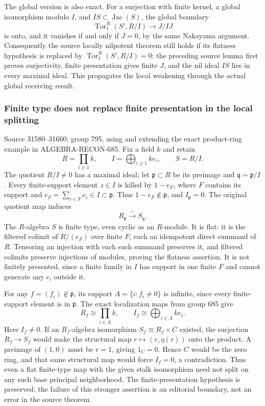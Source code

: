 The global version is also exact. For a surjection with finite kernel, a global isomorphism modulo \(I\), and \(IS\subset\operatorname{Jac}(S)\), the global boundary \[
\operatorname{Tor}_1^R(S',R/I)\longrightarrow J/IJ
\] is onto, and it vanishes if and only if \(J=0\), by the same Nakayama argument. Consequently the source locally nilpotent theorem still holds if its flatness hypothesis is replaced by \(\operatorname{Tor}_1^R(S',R/I)=0\): the preceding source lemma first proves surjectivity, finite presentation gives finite \(J\), and the nil ideal \(IS\) lies in every maximal ideal. This propagates the local weakening through the actual global receiving result.

\subsubsection{Finite type does not replace finite presentation in the local splitting}\label{algebra-proof-035-finite-type-does-not-replace-finite-presentation-in-the-local-splitting}

Source 31580--31660; group 795, using and extending the exact product-ring example in ALGEBRA-RECON-685. Fix a field \(k\) and retain \[
R=\prod_{i\ge1}k,\qquad I=\bigoplus_{i\ge1}ke_i,\qquad S=R/I.
\] The quotient \(R/I\ne0\) has a maximal ideal; let \(\mathfrak p\subset R\) be its preimage and \(\mathfrak q=\mathfrak p/I\). Every finite-support element \(z\in I\) is killed by \(1-e_F\), where \(F\) contains its support and \(e_F=\sum_{i\in F}e_i\in I\subset\mathfrak p\). Thus \(1-e_F\notin\mathfrak p\), and \(I_{\mathfrak p}=0\). The original quotient map induces \[
R_{\mathfrak p}\xrightarrow{\sim}S_{\mathfrak q}.
\] The \(R\)-algebra \(S\) is finite type, even cyclic as an \(R\)-module. It is flat: it is the filtered colimit of \(R/(e_F)\) over finite \(F\), each an idempotent direct summand of \(R\). Tensoring an injection with each such summand preserves it, and filtered colimits preserve injections of modules, proving the flatness assertion. It is not finitely presented, since a finite family in \(I\) has support in one finite \(F\) and cannot generate any \(e_i\) outside it.

For any \(f=(f_i)\notin\mathfrak p\), its support \(A=\{i:f_i\ne0\}\) is infinite, since every finite-support element is in \(\mathfrak p\). The exact localization maps from group 685 give \[
R_f\cong\prod_{i\in A}k,\qquad I_f\cong\bigoplus_{i\in A}ke_i.
\] Here \(I_f\ne0\). If an \(R_f\)-algebra isomorphism \(S_f\cong R_f\times C\) existed, the surjection \(R_f\to S_f\) would make the structural map \(r\mapsto(r,\eta(r))\) onto the product. A preimage of \((1,0)\) must be \(r=1\), giving \(1_C=0\). Hence \(C\) would be the zero ring, and that same structural map would force \(I_f=0\), a contradiction. Thus even a flat finite-type map with the given stalk isomorphism need not split on any such base principal neighborhood. The finite-presentation hypothesis is preserved; the failure of this stronger assertion is an editorial boundary, not an error in the source theorem.


